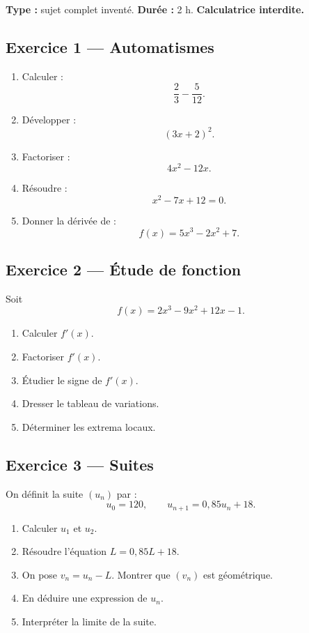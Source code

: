 \documentclass[11pt,a4paper]{article}
\begin{document}
\hypertarget{P-SUJET-05}{}
\begin{sujettype}
\textbf{Type :} sujet complet inventé.  
\textbf{Durée :} 2 h.  
\textbf{Calculatrice interdite.}

\subsection*{Exercice 1 — Automatismes}

\begin{enumerate}
  \item Calculer :
  \[
  \frac{2}{3}-\frac{5}{12}.
  \]
  \item Développer :
  \[
  (3x+2)^2.
  \]
  \item Factoriser :
  \[
  4x^2-12x.
  \]
  \item Résoudre :
  \[
  x^2-7x+12=0.
  \]
  \item Donner la dérivée de :
  \[
  f(x)=5x^3-2x^2+7.
  \]
\end{enumerate}

\subsection*{Exercice 2 — Étude de fonction}

Soit
\[
f(x)=2x^3-9x^2+12x-1.
\]

\begin{enumerate}
  \item Calculer $f'(x)$.
  \item Factoriser $f'(x)$.
  \item Étudier le signe de $f'(x)$.
  \item Dresser le tableau de variations.
  \item Déterminer les extrema locaux.
\end{enumerate}

\subsection*{Exercice 3 — Suites}

On définit la suite $(u_n)$ par :
\[
u_0=120,
\qquad
u_{n+1}=0{,}85u_n+18.
\]

\begin{enumerate}
  \item Calculer $u_1$ et $u_2$.
  \item Résoudre l'équation $L=0{,}85L+18$.
  \item On pose $v_n=u_n-L$. Montrer que $(v_n)$ est géométrique.
  \item En déduire une expression de $u_n$.
  \item Interpréter la limite de la suite.
\end{enumerate}
\end{sujettype}
\end{document}
